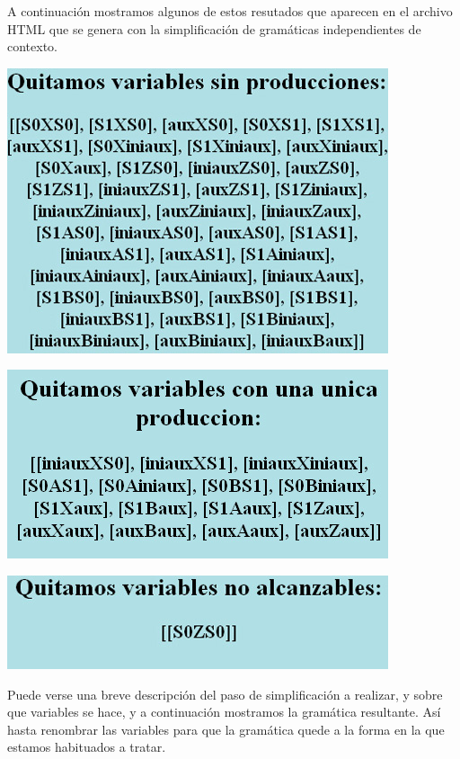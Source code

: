 \documentclass[12pt,a4paper,spanish]{book}
\begin{document}
A continuaci\'on mostramos algunos de estos resutados que aparecen en el archivo HTML que se genera con la simplificaci\'on de gram\'aticas independientes de contexto.\\
\begin{center}
\includegraphics[scale=0.5]{varsinprod.jpg} \newline
\end{center}
\begin{center}
\includegraphics[scale=0.5]{varunaprod.jpg} \newline
\end{center}
\begin{center}
\includegraphics[scale=0.5]{varnoalc.jpg} \newline
\end{center}


Puede verse una breve descripci\'on del paso de simplificaci\'on a realizar, y sobre que variables se hace, y a continuaci\'on mostramos la gram\'atica resultante. As\'i hasta renombrar las variables para que la gram\'atica quede a la forma en la que estamos habituados a tratar.
\end{document}

